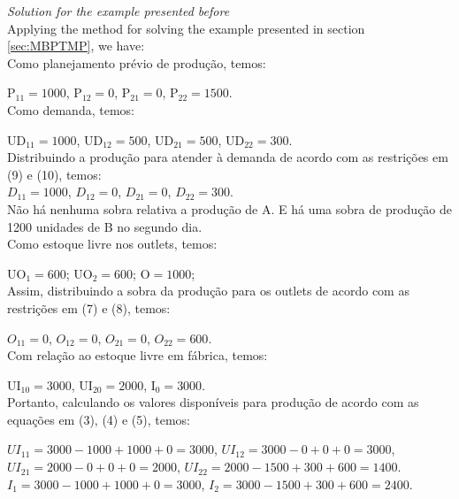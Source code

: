 \documentclass[authoryear,preprint,12pt]{elsarticle}
\begin{document}
\emph{Solution for the example presented before} \\

Applying the method for solving the example presented in section \ref{sec:MBPTMP}, we have: \\

Como planejamento prévio de produção, temos:

$\textrm{P}_{11} = 1000$,
$\textrm{P}_{12} = 0$,
$\textrm{P}_{21} = 0$,
$\textrm{P}_{22} = 1500$. \\

Como demanda, temos:

$\textrm{UD}_{11} = 1000$,
$\textrm{UD}_{12} = 500$,
$\textrm{UD}_{21} = 500$,
$\textrm{UD}_{22} = 300$. \\

Distribuindo a produção para atender à demanda de acordo com as restrições em (9) e (10), temos: \\

$D_{11} = 1000$,
$D_{12} = 0$,
$D_{21} = 0$,
$D_{22} = 300$. \\

Não há nenhuma sobra relativa a produção de A. E há uma sobra de produção de 1200 unidades de B no segundo dia. \\

Como estoque livre nos outlets, temos:

$\textrm{UO}_{1} = 600$;
$\textrm{UO}_{2} = 600$;
$\textrm{O} = 1000$; \\

Assim, distribuindo a sobra da produção para os outlets de acordo com as restrições em (7) e (8), temos:

$O_{11} = 0$,
$O_{12} = 0$,
$O_{21} = 0$,
$O_{22} = 600$. \\

Com relação ao estoque livre em fábrica, temos:

$\textrm{UI}_{10} = 3000$,
$\textrm{UI}_{20} = 2000$,
$\textrm{I}_{0} = 3000$. \\

Portanto, calculando os valores disponíveis para produção de acordo com as equações em (3), (4) e (5), temos:

$UI_{11} = 3000 - 1000 + 1000 + 0 =  3000$,
$UI_{12} = 3000 - 0 + 0 + 0 =  3000$,
$UI_{21} = 2000 - 0 + 0 + 0 =  2000$,
$UI_{22} = 2000 - 1500 + 300 + 600 =  1400$. \\

$I_{1} = 3000 - 1000 + 1000 + 0 = 3000$,
$I_{2} = 3000 - 1500 + 300 + 600 = 2400$. \\
\end{document}

